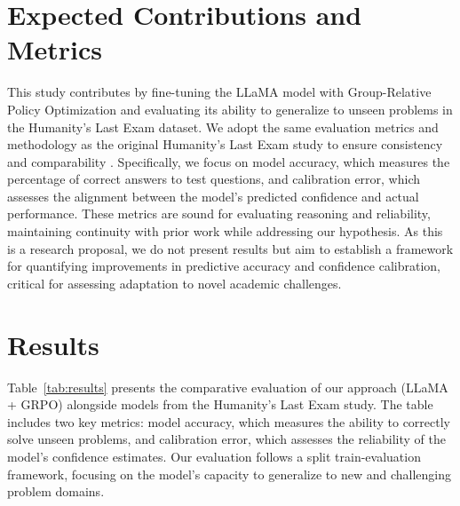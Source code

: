 \documentclass{svproc}
\begin{document}
\section{Expected Contributions and Metrics}
This study contributes by fine-tuning the LLaMA model with Group-Relative Policy Optimization and evaluating its ability to generalize to unseen problems in the Humanity's Last Exam dataset. We adopt the same evaluation metrics and methodology as the original Humanity's Last Exam study to ensure consistency and comparability \cite{phan2025humanitysexam}. Specifically, we focus on model accuracy, which measures the percentage of correct answers to test questions, and calibration error, which assesses the alignment between the model's predicted confidence and actual performance. These metrics are sound for evaluating reasoning and reliability, maintaining continuity with prior work while addressing our hypothesis. As this is a research proposal, we do not present results but aim to establish a framework for quantifying improvements in predictive accuracy and confidence calibration, critical for assessing adaptation to novel academic challenges.





\section{Results}

Table~\ref{tab:results} presents the comparative evaluation of our approach (LLaMA + GRPO) alongside models from the Humanity's Last Exam study. The table includes two key metrics: model accuracy, which measures the ability to correctly solve unseen problems, and calibration error, which assesses the reliability of the model’s confidence estimates. Our evaluation follows a split train-evaluation framework, focusing on the model’s capacity to generalize to new and challenging problem domains.
\end{document}
